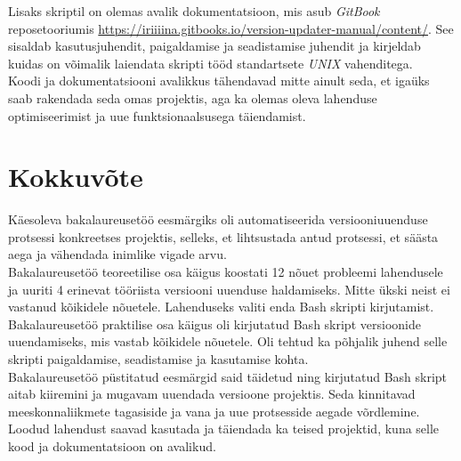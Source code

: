 \documentclass[12pt]{report}
\begin{document}
  Lisaks skriptil on olemas avalik dokumentatsioon, mis asub \textit{GitBook} reposetooriumis \url{https://iriiiina.gitbooks.io/version-updater-manual/content/}. See sisaldab kasutusjuhendit, paigaldamise ja seadistamise juhendit ja kirjeldab kuidas on võimalik laiendata skripti tööd standartsete \textit{UNIX} vahenditega.\\
  
  Koodi ja dokumentatsiooni avalikkus tähendavad mitte ainult seda, et igaüks saab rakendada seda omas projektis, aga ka olemas oleva lahenduse optimiseerimist ja uue funktsionaalsusega täiendamist.
  
  \newpage
  
  \section*{Kokkuvõte}
  \label{kokkuvote}
  
  Käesoleva bakalaureusetöö eesmärgiks oli automatiseerida versiooniuuenduse protsessi konkreetses projektis, selleks, et lihtsustada antud protsessi, et säästa aega ja vähendada inimlike vigade arvu.\\
  
  Bakalaureusetöö teoreetilise osa käigus koostati 12 nõuet probleemi lahendusele ja uuriti 4 erinevat tööriista versiooni uuenduse haldamiseks. Mitte ükski neist ei vastanud kõikidele nõuetele. Lahenduseks valiti enda Bash skripti kirjutamist.\\
  
  Bakalaureusetöö praktilise osa käigus oli kirjutatud Bash skript versioonide uuendamiseks, mis vastab kõikidele nõuetele. Oli tehtud ka põhjalik juhend selle skripti paigaldamise, seadistamise ja kasutamise kohta.\\
  
  Bakalaureusetöö püstitatud eesmärgid said täidetud ning kirjutatud Bash skript aitab kiiremini ja mugavam uuendada versioone projektis. Seda kinnitavad meeskonnaliikmete tagasiside ja vana ja uue protsesside aegade võrdlemine.\\
  
  Loodud lahendust saavad kasutada ja täiendada ka teised projektid, kuna selle kood ja dokumentatsioon on avalikud.

  \newpage
  
\end{document}
